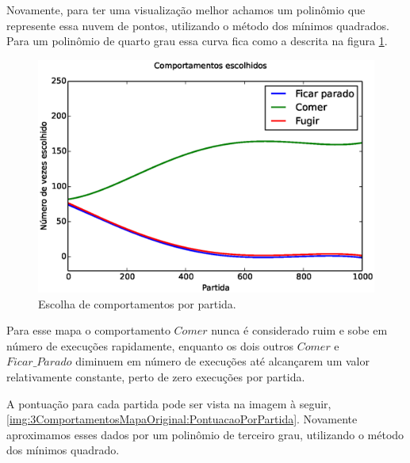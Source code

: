 Novamente, para ter uma visualização melhor achamos um polinômio que represente essa nuvem de pontos, utilizando o método dos mínimos quadrados. Para um polinômio de quarto grau essa curva fica como a descrita na figura \ref{img:3ComportamentosMapaOriginal:ComportamentosEscolhidosPolinômio}.

\begin{figure}[H]
    \centering
    \includegraphics[width=\linewidth]{images/3_behaviors_original_map/chosen_behaviors_pol}
    \caption{Escolha de comportamentos por partida.}
    \label{img:3ComportamentosMapaOriginal:ComportamentosEscolhidosPolinômio}
\end{figure}

Para esse mapa o comportamento $ Comer $ nunca é considerado ruim e sobe em número de execuções rapidamente, enquanto os dois outros $ Comer $ e $ Ficar\_Parado $ diminuem em número de execuções até alcançarem um valor relativamente constante, perto de zero execuções por partida.

A pontuação para cada partida pode ser vista na imagem à seguir, \ref{img:3ComportamentosMapaOriginal:PontuacaoPorPartida}. Novamente aproximamos esses dados por um polinômio de terceiro grau, utilizando o método dos mínimos quadrado.

